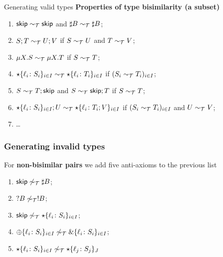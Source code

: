 \documentclass[10pt]{beamer}
\begin{document}
\begin{frame}{Generating valid types}
\textbf{Properties of type bisimilarity (a subset)}
  \begin{enumerate} 
  \item $\mathsf{skip} \sim_\mathcal T \mathsf{skip}$ and $\sharp B \sim_\mathcal T \sharp B$;
  \item $S;T \sim_\mathcal T U;V$ if $S \sim_\mathcal T U$ and $T \sim_\mathcal T V$;
  \item $\mu X.S \sim_\mathcal T \mu X.T$ if $S \sim_\mathcal T T$;
  \item $\star\{\ell_i\colon S_i\}_{i\in I}\sim_\mathcal T
    \star\{\ell_i\colon T_i\}_{i\in I}$ if $(S_i \sim_\mathcal T T_i)_{i\in
      I}$;
  \item $S\sim_\mathcal T T;\mathsf{skip}$ and $S\sim_\mathcal T \mathsf{skip};T$ if $S \sim_\mathcal T T$;
  \item $\star\{\ell_i\colon S_i\}_{i\in I};U\sim_\mathcal T
    \star\{\ell_i\colon T_i;V\}_{i\in I}$ if $(S_i \sim_\mathcal T T_i)_{i\in
      I}$ and $U \sim_\mathcal T V$;
    \item \dots
  \end{enumerate}
  
\end{frame}

\begin{frame}
  \frametitle{Generating invalid types}
  For \textbf{non-bisimilar pairs} we add five anti-axioms to the previous list

  \begin{enumerate}
  \item $\mathsf{skip} \not\sim_\mathcal T \sharp B$;
  \item $?B \not\sim_\mathcal T !B$;
  \item $\mathsf{skip} \not\sim_\mathcal T \star\{\ell_i\colon S_i\}_{i\in I}$;
  \item $\oplus\{\ell_i\colon S_i\}_{i\in I} \not\sim_\mathcal T \&\{\ell_i\colon S_i\}_{i\in I}$;
  \item $\star\{\ell_i\colon S_i\}_{i\in I} \not\sim_\mathcal T \star\{\ell_j\colon S_j\}_J$
  \end{enumerate}
\end{frame}
\end{document}
